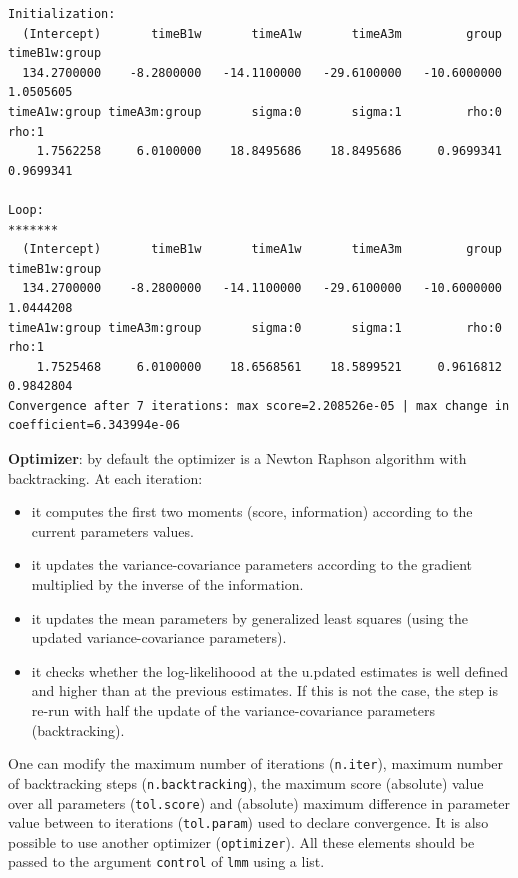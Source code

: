 \documentclass[12pt]{article}
\begin{document}
\begin{verbatim}
Initialization:
  (Intercept)       timeB1w       timeA1w       timeA3m         group timeB1w:group 
  134.2700000    -8.2800000   -14.1100000   -29.6100000   -10.6000000     1.0505605 
timeA1w:group timeA3m:group       sigma:0       sigma:1         rho:0         rho:1 
    1.7562258     6.0100000    18.8495686    18.8495686     0.9699341     0.9699341 

Loop:
*******
  (Intercept)       timeB1w       timeA1w       timeA3m         group timeB1w:group 
  134.2700000    -8.2800000   -14.1100000   -29.6100000   -10.6000000     1.0444208 
timeA1w:group timeA3m:group       sigma:0       sigma:1         rho:0         rho:1 
    1.7525468     6.0100000    18.6568561    18.5899521     0.9616812     0.9842804 
Convergence after 7 iterations: max score=2.208526e-05 | max change in coefficient=6.343994e-06
\end{verbatim}

\textbf{Optimizer}: by default the optimizer is a Newton Raphson algorithm
with backtracking. At each iteration:
\begin{itemize}
\item it computes the first two moments (score, information) according to
the current parameters values.
\item it updates the variance-covariance parameters according to the
gradient multiplied by the inverse of the information.
\item it updates the mean parameters by generalized least squares (using
the updated variance-covariance parameters).
\item it checks whether the log-likelihoood at the u.pdated estimates is
well defined and higher than at the previous estimates. If this is
not the case, the step is re-run with half the update of the
variance-covariance parameters (backtracking).
\end{itemize}

One can modify the maximum number of iterations (\texttt{n.iter}), maximum
number of backtracking steps (\texttt{n.backtracking}), the maximum score
(absolute) value over all parameters (\texttt{tol.score}) and (absolute)
maximum difference in parameter value between to iterations
(\texttt{tol.param}) used to declare convergence. It is also possible to use
another optimizer (\texttt{optimizer}). All these elements should be passed
to the argument \texttt{control} of \texttt{lmm} using a list.

\clearpage
\end{document}
